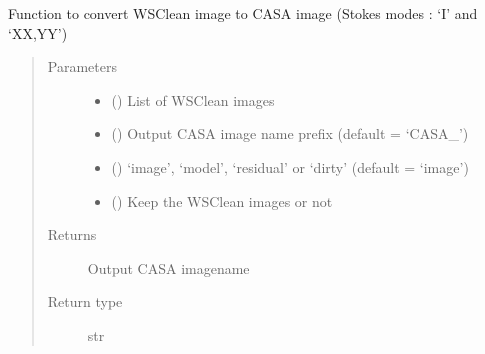 \documentclass[letterpaper,10pt,english]{sphinxmanual}
\begin{document}
\begin{fulllineitems}
\begin{fulllineitems}
\label{\detokenize{paircars:paircars.intensity_selfcal_LTS.IntensitySelfcal.wsclean_to_casaimage}}
\sphinxAtStartPar
Function to convert WSClean image to CASA image
(Stokes modes : ‘I’ and ‘XX,YY’)
\begin{quote}\begin{description}
\item[{Parameters}] \leavevmode\begin{itemize}
\item {} 
\sphinxAtStartPar
{} () \textendash{} List of WSClean images

\item {} 
\sphinxAtStartPar
{} () \textendash{} Output CASA image name prefix (default = ‘CASA\_’)

\item {} 
\sphinxAtStartPar
{} () \textendash{} ‘image’, ‘model’, ‘residual’ or ‘dirty’ (default = ‘image’)

\item {} 
\sphinxAtStartPar
{} () \textendash{} Keep the WSClean images or not

\end{itemize}

\item[{Returns}] \leavevmode
\sphinxAtStartPar
Output CASA imagename

\item[{Return type}] \leavevmode
\sphinxAtStartPar
str

\end{description}\end{quote}

\end{fulllineitems}


\end{fulllineitems}
\end{document}
